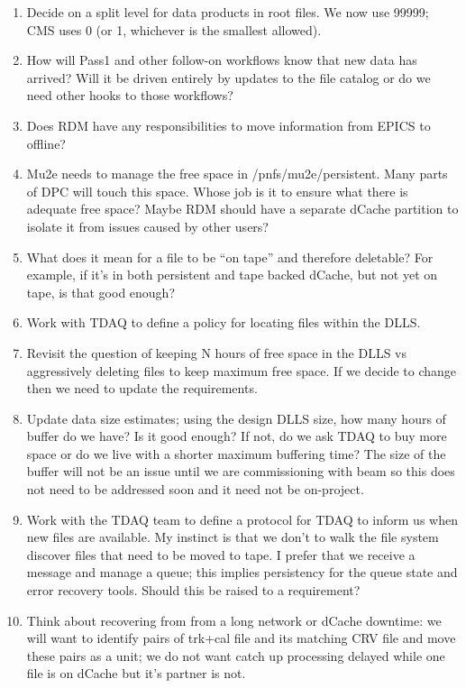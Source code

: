 \begin{enumerate}
\item Decide on a split level for data products in \art root files.  We now use 99999; CMS uses 0 (or 1, whichever is the smallest allowed).
\item How will Pass1 and other follow-on workflows know that new data has arrived?
  Will it be driven entirely by updates to the file catalog or do we need other
  hooks to those workflows?
\item Does RDM have any responsibilities to move information from EPICS to offline?
\item Mu2e needs to manage the free space in /pnfs/mu2e/persistent. Many parts of DPC will touch this space.
  Whose job is it to ensure what there is adequate free space? Maybe RDM should have a separate dCache
  partition to isolate it from issues caused by other users?
\item What does it mean for a file to be ``on tape'' and therefore deletable?
  For example, if it's in both persistent and tape backed dCache, but not yet on tape, is that good enough?
\item Work with TDAQ to define a policy for locating files within the DLLS.
\item Revisit the question of keeping N hours of free space in the DLLS vs aggressively deleting files to keep
  maximum free space.  If we decide to change then we need to update the requirements.
\item Update data size estimates; using the design DLLS size, how many hours of buffer do we have?  Is it good enough?
  If not, do we ask TDAQ to buy more space or do we live with a shorter maximum buffering time?
  The size of the buffer will not be an issue until we are commissioning with beam so this does not need to
  be addressed soon and it need not be on-project.
\item Work with the TDAQ team to define a protocol for TDAQ to inform us when new files are available.
  My instinct is that we don't to walk the file system discover files that need to be moved to tape.
  I prefer that we receive a message and manage a queue; this implies persistency for the queue state
  and error recovery tools.
  Should this be raised to a requirement?
\item
  Think about recovering from from a long network or dCache downtime:
  we will want to identify pairs of trk+cal file and its matching CRV file and move these pairs as a unit;
  we do not want catch up processing delayed while one file is on dCache but it's partner is not.

\end{enumerate}

